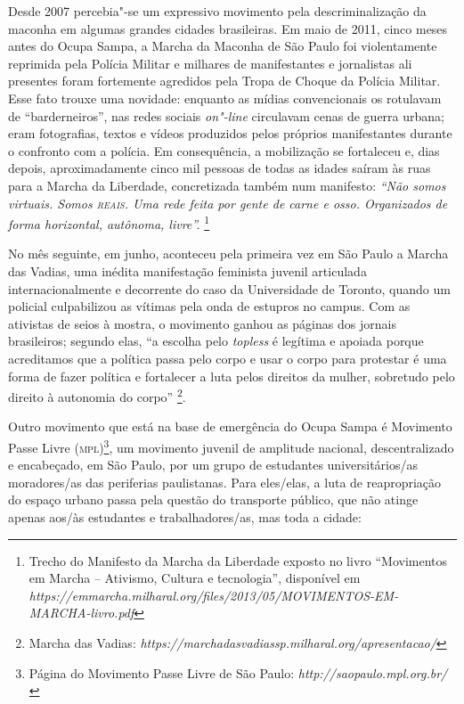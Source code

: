 Desde 2007 percebia"-se um expressivo movimento pela descriminalização da
maconha em algumas grandes cidades brasileiras. Em maio de 2011, cinco
meses antes do Ocupa Sampa, a Marcha da Maconha de São Paulo foi
violentamente reprimida pela Polícia Militar e milhares de manifestantes
e jornalistas ali presentes foram fortemente agredidos pela Tropa de
Choque da Polícia Militar. Esse fato trouxe uma novidade: enquanto as
mídias convencionais os rotulavam de ``barderneiros'', nas redes sociais
\emph{on"-line} circulavam cenas de guerra urbana; eram fotografias,
textos e vídeos produzidos pelos próprios manifestantes durante o
confronto com a polícia. Em consequência, a mobilização se fortaleceu e,
dias depois, aproximadamente cinco mil pessoas de todas as idades saíram
às ruas para a Marcha da Liberdade, concretizada também num manifesto:
\emph{``Não somos virtuais. Somos \textsc{reais}. Uma rede feita por gente de
carne e osso. Organizados de forma horizontal, autônoma, livre''.}
\footnote{Trecho do Manifesto da Marcha da Liberdade exposto no livro
  ``Movimentos em Marcha -- Ativismo, Cultura e tecnologia'', disponível
  em
  \emph{https://emmarcha.milharal.org/files/2013/05/MOVIMENTOS-EM-MARCHA-livro.pdf}}

No mês seguinte, em junho, aconteceu pela primeira vez em São Paulo a
Marcha das Vadias, uma inédita manifestação feminista juvenil articulada
internacionalmente e decorrente do caso da Universidade de Toronto,
quando um policial culpabilizou as vítimas pela onda de estupros no
campus. Com as ativistas de seios à mostra, o movimento ganhou as
páginas dos jornais brasileiros; segundo elas, ``a escolha pelo
\emph{topless} é legítima e apoiada porque acreditamos que a política
passa pelo corpo e usar o corpo para protestar é uma forma de fazer
política e fortalecer a luta pelos direitos da mulher, sobretudo pelo
direito à autonomia do corpo'' \footnote{Marcha das Vadias:
  \emph{https://marchadasvadiassp.milharal.org/apresentacao/}}.

Outro movimento que está na base de emergência do Ocupa Sampa é
Movimento Passe Livre (\textsc{mpl})\footnote{Página do Movimento Passe Livre de
  São Paulo: \emph{http://saopaulo.mpl.org.br/}}, um movimento juvenil de
amplitude nacional, descentralizado e encabeçado, em São Paulo, por um
grupo de estudantes universitários/as moradores/as das periferias
paulistanas. Para eles/elas, a luta de reapropriação do espaço urbano
passa pela questão do transporte público, que não atinge apenas aos/às
estudantes e trabalhadores/as, mas toda a cidade:

